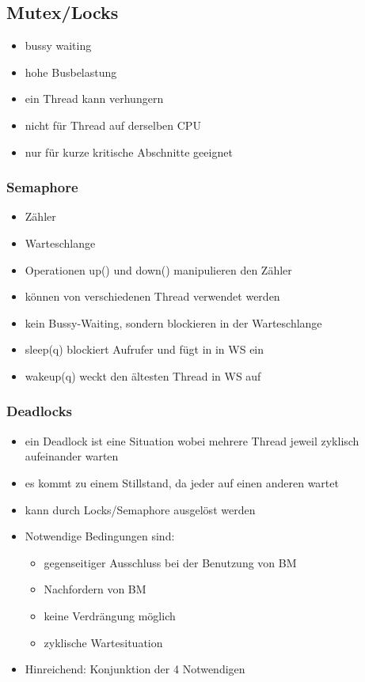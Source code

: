 \documentclass[12pt,a4paper]{article}
\begin{document}
\subsection{Mutex/Locks}
\begin{itemize}
\item bussy waiting
\item hohe Busbelastung
\item ein Thread kann verhungern
\item nicht für Thread auf derselben CPU
\item nur für kurze kritische Abschnitte geeignet
\end{itemize}

\subsubsection{Semaphore}
\begin{itemize}
\item Zähler 
\item Warteschlange
\item Operationen up() und down() manipulieren den Zähler
\item können von verschiedenen Thread verwendet werden
\item kein Bussy-Waiting, sondern blockieren in der Warteschlange
\item sleep(q) blockiert Aufrufer und fügt in in WS ein
\item wakeup(q) weckt den ältesten Thread in WS auf
\end{itemize}

\subsubsection{Deadlocks}
\begin{itemize}
\item ein Deadlock ist eine Situation wobei mehrere Thread jeweil zyklisch aufeinander warten
\item es kommt zu einem Stillstand, da jeder auf einen anderen wartet
\item kann durch Locks/Semaphore ausgelöst werden
\item Notwendige Bedingungen sind:
\begin{itemize}
\item gegenseitiger Ausschluss bei der Benutzung von BM
\item Nachfordern von BM
\item keine Verdrängung möglich
\item zyklische Wartesituation
\end{itemize}
\item Hinreichend: Konjunktion der 4 Notwendigen
\end{itemize}
\end{document}
